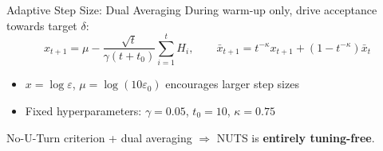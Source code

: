 \documentclass{beamer}
\begin{document}
\begin{frame}{Adaptive Step Size: Dual Averaging}
  During warm-up only, drive acceptance towards target $\delta$:
  \[
    x_{t+1} = \mu - \frac{\sqrt{t}}{\gamma(t+t_0)}\sum_{i=1}^{t}H_i,
    \qquad
    \bar{x}_{t+1} = t^{-\kappa}x_{t+1} + (1-t^{-\kappa})\bar{x}_t
  \]
  \vspace{-0.1cm}
  \begin{itemize}
    \item $x=\log\varepsilon$, \quad $\mu=\log(10\varepsilon_0)$ encourages larger step sizes
    \item Fixed hyperparameters: $\gamma=0.05$,\; $t_0=10$,\; $\kappa=0.75$
  \end{itemize}

  \vspace{0.2cm}
  \begin{tcolorbox}[keybox]
    No-U-Turn criterion + dual averaging $\Rightarrow$ NUTS is \textbf{entirely tuning-free}.
  \end{tcolorbox}
\end{frame}

% 
% 
\end{document}
